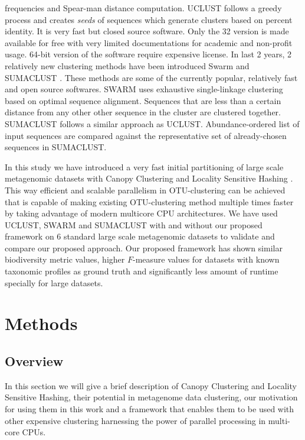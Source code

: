 \documentclass[10pt, conference, compsocconf]{IEEEtran}
\begin{document}
frequencies and Spear-man distance computation. UCLUST \cite{MARuclust} follows a greedy process and creates \textit{seeds} of sequences which generate clusters based on percent identity. It is very fast but closed source software. Only the 32 version is made available for free with very limited documentations for academic and non-profit usage. 64-bit version of the software require expensive license. In last 2 years, 2 relatively new clustering methods have been introduced Swarm \cite{MARSwarm}\cite{MARSwarm2} and SUMACLUST \cite{MARSumaclust}. These methods are some of the currently popular, relatively fast \cite{MARDeNovo} and open source softwares. SWARM uses exhaustive single-linkage clustering based on optimal sequence alignment. Sequences that are less than a certain distance from any other other sequence in the cluster are clustered together. SUMACLUST follows a similar approach as UCLUST. Abundance-ordered list of input sequences are compared against the representative set of already-chosen sequences in SUMACLUST.

In this study we have introduced a very fast initial partitioning of large scale metagenomic datasets with Canopy Clustering \cite{MARCanopy} and Locality Sensitive Hashing \cite{MARLshRef1}\cite{MARLshRef2}\cite{MARLshRef3}. This way efficient and scalable parallelism in OTU-clustering can be achieved that is capable of making existing OTU-clustering method multiple times faster by taking advantage of modern multicore CPU architectures. We have used UCLUST, SWARM and SUMACLUST with and without our proposed framework on 6 standard large scale metagenomic datasets to validate and compare our proposed approach. Our proposed framework has shown similar biodiversity metric values, higher $F$-measure values for datasets with known taxonomic profiles as ground truth and significantly less amount of runtime specially for large datasets.  

\section{Methods}
\label{featMethod}
\subsection{Overview}
In this section we will give a brief description of Canopy Clustering and Locality Sensitive Hashing, their potential in metagenome data clustering, our motivation for using them in this work and a framework that enables them to be used with other expensive clustering harnessing the power of parallel processing in multi-core CPUs.     
\end{document}
